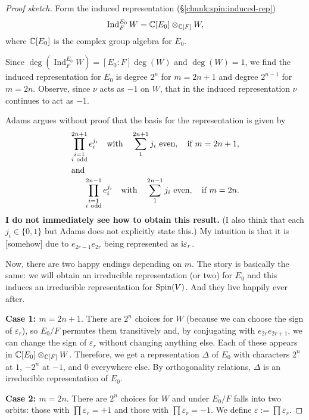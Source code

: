 \begin{proof}[Proof sketch]
Form the induced representation (\S\ref{chunk:spin:induced-rep})
\begin{equation}
\operatorname{Ind}^{E_{0}}_{F}W = \mathbb{C}[E_{0}]\otimes_{\mathbb{C}[F]}W,
\end{equation}
where $\mathbb{C}[E_{0}]$ is the complex group algebra for $E_{0}$.

Since $\deg(\operatorname{Ind}^{E_{0}}_{F}W)=[E_{0}:F]\deg(W)$ and
$\deg(W)=1$, we find the induced representation for $E_{0}$ is degree
$2^{n}$ for $m=2n+1$ and degree $2^{n-1}$ for $m=2n$. Observe, since
$\nu$ acts as $-1$ on $W$, that in the induced representation $\nu$
continues to act as $-1$.

Adams argues without proof that the basis for the representation is
given by
\begin{subequations}
\begin{align}
\prod^{2n+1}_{\substack{i=1\\i~\text{odd}}}e_{i}^{j_{i}}\quad\mbox{with}\quad\sum^{2n+1}_{1}j_{i}~\mbox{even},\quad\mbox{if }
m=2n+1,\\
\intertext{and}
\prod^{2n-1}_{\substack{i=1\\i~\text{odd}}}e_{i}^{j_{i}}\quad\mbox{with}\quad\sum^{2n-1}_{1}j_{i}~\mbox{even},\quad\mbox{if }
m=2n.
\end{align}
\end{subequations}
\textbf{I do not immediately see how to obtain this result.} (I also
think that each $j_{i}\in\{0,1\}$ but Adams does not explicitly state this.)
My intuition is that it is [somehow] due to $e_{2r-1}e_{2r}$ being
represented as $\mathrm{i}\varepsilon_{r}$.

Now, there are two happy endings depending on $m$. The story is
basically the same: we will obtain an irreducible representation (or
two) for $E_{0}$ and this induces an irreducible representation for
$\operatorname{Spin}(V)$. And they live happily ever after.

\textbf{Case 1: $m=2n+1$}. There are $2^{n}$ choices for $W$ (because we
can choose the sign of $\varepsilon_{r}$), so $E_{0}/F$ permutes them
transitively and, by conjugating with $e_{2r}e_{2r+1}$, we can change
the sign of $\varepsilon_{r}$ without changing anything else. Each of
these appears in $\mathbb{C}[E_{0}]\otimes_{\mathbb{C}[F]}W$. Therefore, we get a
representation $\Delta$ of $E_{0}$ with characters $2^{n}$ at $1$,
$-2^{n}$ at $-1$, and $0$ everywhere else. By orthogonality relations,
$\Delta$ is an irreducible representation of $E_{0}$.

\textbf{Case 2: $m=2n$}. There are $2^{n}$ choices for $W$  and under
$E_{0}/F$ falls into two orbits: those with $\prod\varepsilon_{r}=+1$
and those with $\prod\varepsilon_{r}=-1$. We define $\varepsilon:=\prod\varepsilon_{r}$.


\end{proof}
